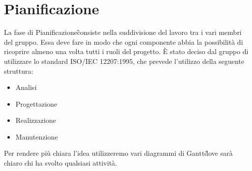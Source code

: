\newpage
\section{Pianificazione}\label{Pianificazione}
    La fase di Pianificazione\G consiste nella suddivisione del lavoro tra i vari membri del gruppo. Essa deve fare in modo che ogni componente abbia la possibilità di ricoprire almeno una volta tutti i ruoli del progetto.
    È stato deciso dal gruppo di utilizzare lo standard ISO/IEC 12207:1995\GAlt, che prevede l'utilizzo della seguente struttura:
    \begin{itemize}
        \item Analisi
        \item Progettazione
        \item Realizzazione
        \item Manutenzione
    \end{itemize}
    Per rendere più chiara l'idea utilizzeremo vari diagrammi di Gantt\G dove sarà chiaro chi ha svolto qualsiasi attività.

